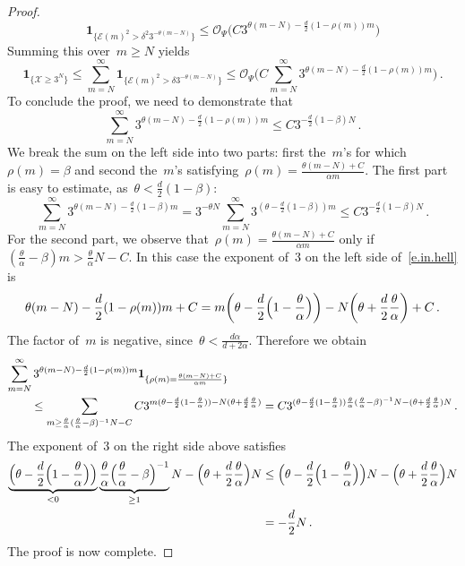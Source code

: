 \documentclass[11pt,twoside]{article} %
\numberwithin{equation}{section}
\theoremstyle{definition}
\newcommand{\X}{\mathcal{X}}
\renewcommand{\O}{\mathcal{O}}
\newcommand{\indc}{\boldsymbol{1}}
\begin{document}
\begin{proof}
\begin{equation*}
\indc_{\{ \mathcal{E}(m)^2 >  \delta^2 3^{-\theta(m-N)} \}} 
\leq 
\O_{\Psi} \bigl( C3^{\theta (m-N)-\frac d2(1-\rho(m))m} \bigr) 
\end{equation*}
Summing this over~$m\geq N$ yields
\begin{equation*}
\indc_{\{ \X \geq 3^N \}} 
\leq
\sum_{m=N}^\infty
\indc_{\{ \mathcal{E}(m)^2 >  \delta 3^{-\theta(m-N)} \}} 
\leq 
\O_{\Psi} \biggl( C\sum_{m=N}^\infty3^{\theta (m-N)-\frac d2(1-\rho(m))m} \biggr) \,.
\end{equation*}
To conclude the proof, we need to demonstrate that 
\begin{equation}
\label{e.in.hell}
\sum_{m=N}^\infty3^{\theta (m-N)-\frac d2(1-\rho(m))m}
\leq 
C 3^{-\frac d2(1-\beta)N}\,.
\end{equation}
We break the sum on the left side into two parts: first the~$m$'s for which~$\rho(m) = \beta$ and second the~$m$'s satisfying~$\rho(m) = \frac{\theta(m-N)+C}{\alpha m}$. The first part is easy to estimate, as~$\theta < \frac d2(1-\beta)$: 
\begin{equation*}
\sum_{m=N}^\infty
3^{\theta (m-N)-\frac d2(1-\beta)m}
=
3^{-\theta N} \sum_{m=N}^\infty
3^{(\theta -\frac d2(1-\beta))m}
\leq 
C 3^{-\frac d2(1-\beta)N}\,.
\end{equation*}
For the second part, we observe that~$\rho(m) = \frac{\theta(m-N)+C}{\alpha m}$ only if~$(\frac \theta \alpha -\beta)m > \frac \theta \alpha N - C$. 
In this case the exponent of~$3$ on the left side of~\eqref{e.in.hell} is
\begin{equation*}
\theta (m-N)-\frac d2(1-\rho(m))m + C
= m \biggl( \theta -  \frac d2 \Bigl( 1 - \frac \theta \alpha \Bigr) \biggr) - N \biggl( \theta + \frac d2 \frac \theta\alpha\biggr) + C \,.
\end{equation*}
The factor of~$m$ is negative, since~$\theta < \frac {d\alpha}{d+2\alpha}$. Therefore we obtain
\begin{align*}
\lefteqn{ 
\sum_{m=N}^\infty
3^{\theta (m-N)-\frac d2(1-\rho(m))m} 
\indc_{\{ \rho(m) = \frac{\theta(m-N)+C}{\alpha m} \}} 
} \qquad & 
\notag \\ & 
\leq
\sum_{m \geq \frac \theta \alpha (\frac \theta \alpha -\beta)^{-1} N-C}
C3^{m ( \theta -  \frac d2 ( 1 - \frac \theta \alpha ) ) - N ( \theta + \frac d2 \frac \theta\alpha)} 
=
C3^{( \theta -  \frac d2 ( 1 - \frac \theta \alpha ) )\frac \theta \alpha (\frac \theta \alpha -\beta)^{-1} N - ( \theta + \frac d2 \frac \theta\alpha)N } 
\,.
\end{align*}
The exponent of~$3$ on the right side above satisfies 
\begin{align*}
\underbrace{
\Bigl( \theta -  \frac d2 \Bigl( 1 - \frac \theta \alpha \Bigr) \Bigr)
}_{< 0} 
\underbrace{ 
\frac \theta \alpha \Bigl(\frac \theta \alpha -\beta\Bigr)^{-1}
}_{\geq 1 }
N - \Bigl( \theta + \frac d2 \frac \theta\alpha\Bigr)N 
&
\leq 
\Bigl( \theta -  \frac d2 \Bigl( 1 - \frac \theta \alpha \Bigr) \Bigr)  N - \Bigl( \theta + \frac d2 \frac \theta\alpha\Bigr)N 
\notag \\ & 
= -\frac d2 N \,.
\end{align*}
The proof is now complete. 
\end{proof}
\end{document}

